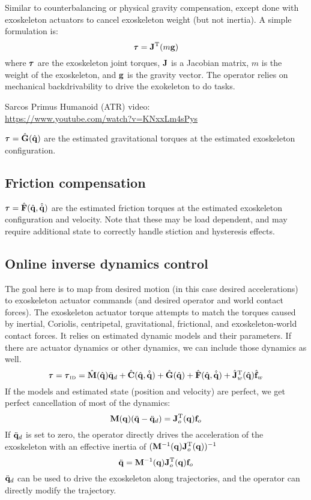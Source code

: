 \documentclass[letterpaper,12pt,fullpage]{article}
\newcommand{\invdyn}{{\mbox {\tiny ID}}}
\begin{document}
Similar to counterbalancing or physical gravity compensation, except done
with exoskeleton actuators to cancel exoskeleton weight (but not inertia).
A simple formulation is:
\begin{equation}
\vtau = \mJ^{\tr} (m\vg)
\end{equation}
where $\vtau$ are the exoskeleton joint torques, 
${\bf J}$ is a Jacobian matrix, $m$ is the weight of the exoskeleton,
and ${\bf g}$ is the gravity vector. 
The operator relies on mechanical backdrivability to drive
the exokeleton to do tasks.

Sarcos Primus Humanoid (ATR) video:\\
\url{https://www.youtube.com/watch?v=KNxxLm4sPys}

$\vtau = \hat{\mG}(\hat{\vq})$ 
are the estimated gravitational torques at the estimated exoskeleton configuration.

\subsection{Friction compensation}

$\vtau = \hat{\mF}(\hat{\vq},\hat{\dot{\vq}})$ 
are the estimated friction torques at the estimated exoskeleton configuration
and velocity.
Note that these may be load dependent, and may require additional state to
correctly handle stiction and hysteresis effects.

\subsection{Online inverse dynamics control}

The goal here is to map from desired motion (in this case desired
accelerations) to exoskeleton actuator commands (and desired operator
and world contact forces).
The exoskeleton actuator torque 
attempts to match the torques caused by inertial, Coriolis, centripetal,
gravitational, frictional, and exoskeleton-world contact forces.
It relies on estimated dynamic models and their parameters.
If there are actuator dynamics or other dynamics, we can include those
dynamics as well.
\begin{equation}
\vtau = \vtau_{\invdyn} 
= \hat{\mM}(\hat{\vq}) \ddot{\vq}_d
+ \hat{\mC}(\hat{\vq},\hat{\dot{\vq}})
+ \hat{\mG}(\hat{\vq})
+ \hat{\mF}(\hat{\vq},\hat{\dot{\vq}})
+ \hat{\mJ}_w^{\tr}(\hat{\vq}) \hat{\vf}_w
\end{equation}
If the models and estimated state (position and velocity) are perfect, we get
perfect cancellation of most of the dynamics:
\begin{equation}
{\bf M}({\bf q}) (\ddot{{\bf q}} - \ddot{{\bf q}}_d) = {\bf J}_o^{{\rm T}}({\bf q}) {\bf f}_o
\end{equation}
If $\ddot{{\bf q}}_d$ is set to zero, the operator directly drives the acceleration
of the exoskeleton with an effective inertia of $({\bf M}^{-1}({\bf q}) {\bf J}_o^{{\rm T}}({\bf q}))^{-1}$
\begin{equation}
\ddot{{\bf q}} = {\bf M}^{-1}({\bf q}) {\bf J}_o^{{\rm T}}({\bf q}) {\bf f}_o
\label{eq:cancel}
\end{equation}
$\ddot{{\bf q}}_d$ can be used to drive the exoskeleton along trajectories, and
the operator can directly modify the trajectory.
\end{document}
